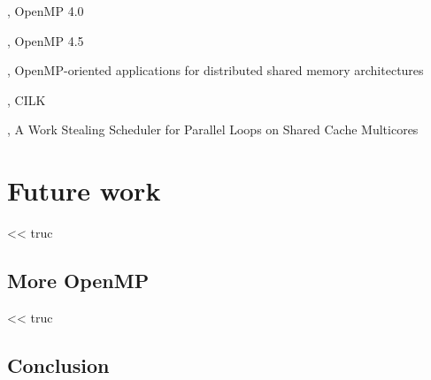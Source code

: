 








\cite{openmp40}, OpenMP 4.0

\cite{openmp45}, OpenMP 4.5

\cite{Marowka2004}, OpenMP-oriented applications for distributed shared memory architectures

\cite{cilk5}, CILK

\cite{Tchiboukdjian2010}, A Work Stealing Scheduler for Parallel Loops on Shared Cache Multicores









\part{Future work}

\begin{savequote}[6cm]
<< truc
\end{savequote}

\chapter{More OpenMP}\label{chap:contrib:TODO}
\chaptertoc

%

\begin{savequote}[6cm]
<< truc
\end{savequote}

\chapter{Conclusion}\label{chap:contrib:TODO}
\chaptertoc

%
%
